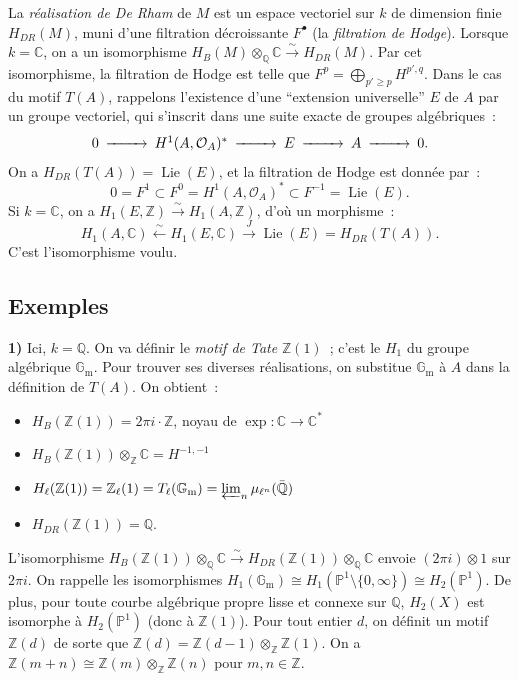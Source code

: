 \documentclass[12pt,a4paper]{article}
\theoremstyle{plain}
\theoremstyle{definition}
\theoremstyle{remark}
\DeclareMathOperator{\Lie}{Lie}
\newcommand{\ZZ}{\mathbb{Z}}
\newcommand{\QQ}{\mathbb{Q}}
\newcommand{\CC}{\mathbb{C}}
\newcommand{\Gm}{\mathbb{G}_\mathrm{m}}
\newcommand{\PP}{\mathbb{P}}
\providecommand{\CC}{\mathbb{C}}
\providecommand{\PP}{\mathbb{P}}
\providecommand{\QQ}{\mathbb{Q}}
\providecommand{\ZZ}{\mathbb{Z}}
\providecommand{\Gm}{\mathbb{G}_{\mathrm m}}
\providecommand{\Lie}{\operatorname{Lie}}
\begin{document}
La \emph{réalisation de De Rham} de $M$ est un espace vectoriel sur $k$ de dimension finie $H_{DR}(M)$, muni d'une filtration décroissante $F^\bullet$ (la \emph{filtration de Hodge}). Lorsque $k = \CC$, on a un isomorphisme $H_B(M) \otimes_\QQ \CC \xrightarrow{\sim} H_{DR}(M)$. Par cet isomorphisme, la filtration de Hodge est telle que $F^p = \bigoplus_{p' \geq p} H^{p',q}$. Dans le cas du motif $T(A)$, rappelons \cite{Weil2} l'existence d'une ``extension universelle'' $E$ de $A$ par un groupe vectoriel, qui s'inscrit dans une suite exacte de groupes algébriques~:
\begin{equation*}
\begin{CD}
0 @>>> H^1(A, \mathcal{O}_A)^* @>>> E @>>> A @>>> 0.
\end{CD}
\end{equation*}
On a $H_{DR}(T(A)) = \Lie(E)$, et la filtration de Hodge est donnée par~:
\[
0 = F^1 \subset F^0 = H^1(A, \mathcal{O}_A)^* \subset F^{-1} = \Lie(E).
\]
Si $k = \CC$, on a $H_1(E, \ZZ) \xrightarrow{\sim} H_1(A, \ZZ)$, d'où un morphisme~:
\[
H_1(A, \CC) \xleftarrow{\sim} H_1(E, \CC) \xrightarrow{J} \Lie(E) = H_{DR}(T(A)).
\]
C'est l'isomorphisme voulu.

\subsection*{Exemples}

\textbf{1)} Ici, $k = \QQ$. On va définir le \emph{motif de Tate} $\ZZ(1)$~; c'est le $H_1$ du groupe algébrique $\Gm$. Pour trouver ses diverses réalisations, on substitue $\Gm$ à $A$ dans la définition de $T(A)$. On obtient~:
\begin{itemize}[label={--}]
\item $H_B(\ZZ(1)) = 2\pi i \cdot \ZZ$, noyau de $\exp : \CC \to \CC^*$
\item $H_B(\ZZ(1)) \otimes_\ZZ \CC = H^{-1,-1}$
\item $H_\ell(\ZZ(1)) = \ZZ_\ell(1) = T_\ell(\Gm) = \varprojlim_n \mu_{\ell^n}(\bar{\QQ})$
\item $H_{DR}(\ZZ(1)) = \QQ$.
\end{itemize}

L'isomorphisme $H_B(\ZZ(1)) \otimes_\QQ \CC \xrightarrow{\sim} H_{DR}(\ZZ(1)) \otimes_\QQ \CC$ envoie $(2\pi i) \otimes 1$ sur $2\pi i$. On rappelle les isomorphismes $H_1(\Gm) \cong H_1(\PP^1 \setminus \{0, \infty\}) \cong H_2(\PP^1)$. De plus, pour toute courbe algébrique propre lisse et connexe sur $\QQ$, $H_2(X)$ est isomorphe à $H_2(\PP^1)$ (donc à $\ZZ(1)$). Pour tout entier $d$, on définit un motif $\ZZ(d)$ de sorte que $\ZZ(d) = \ZZ(d-1) \otimes_\ZZ \ZZ(1)$. On a $\ZZ(m+n) \cong \ZZ(m) \otimes_\ZZ \ZZ(n)$ pour $m, n \in \ZZ$.
\end{document}
